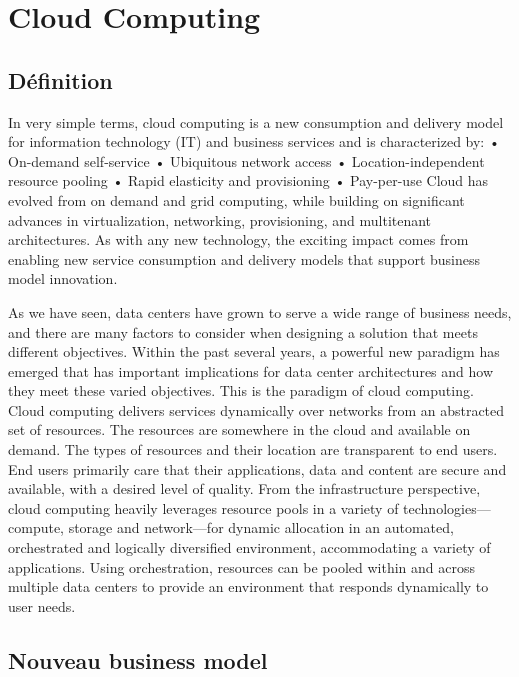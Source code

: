 \chapter{Cloud Computing}

\section{Définition}
In very simple terms, cloud computing is a new consumption and delivery model for information technology (IT) and business services and is characterized by:
 • On-demand self-service
 • Ubiquitous network access
 • Location-independent resource pooling
 • Rapid elasticity and provisioning
 • Pay-per-use
Cloud has evolved from on demand and grid computing, while building on significant advances in virtualization, networking, provisioning, and multitenant architectures. As with any new technology, the exciting impact comes from enabling new service consumption and delivery models that support business model innovation.

As we have seen, data centers have grown to serve a wide range of business needs, and there are many factors to consider when designing a solution that meets different objectives. Within the past several years, a powerful new paradigm has emerged that has important implications for data center architectures and how they meet these varied objectives. This is the paradigm of cloud computing.
Cloud computing delivers services dynamically over networks from an abstracted set of resources. The resources are somewhere in the cloud and available on demand. The types of resources and their location are transparent to end users. End users primarily care that their applications, data and content are secure and available, with a desired level of quality.
From the infrastructure perspective, cloud computing heavily leverages resource pools in a variety of technologies— compute, storage and network—for dynamic allocation in an automated, orchestrated and logically diversified environment, accommodating a variety of applications. Using orchestration, resources can be pooled within and across multiple data centers to provide an environment that responds dynamically to user needs.

\section{Nouveau business model}

